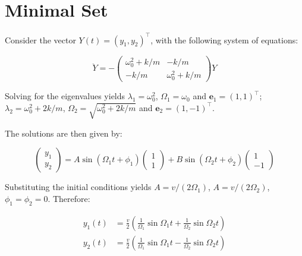 \documentclass[12pt]{article}
\begin{document}



\pagebreak
\section*{Minimal Set}



Consider the vector $Y(t) = (y_{1}, y_{2})^{\intercal}$, with the following system of equations:

\begin{equation}
    \ddot{Y} =
    -\begin{pmatrix}
        \omega_{0}^{2} + k/m & -k/m                 \\
        -k/m                 & \omega_{0}^{2} + k/m
    \end{pmatrix}
    Y
\end{equation}

Solving for the eigenvalues yields $\lambda_{1} = \omega_{0}^{2}$, $\Omega_{1} = \omega_{0}$ and $\mathbf{e}_{1} = (1, 1)^{\intercal}$; $\lambda_{2} = \omega_{0}^{2} + 2k/m$, $\Omega_{2} = \sqrt{\omega_{0}^{2} + 2k/m}$ and $\mathbf{e}_{2} = (1, -1)^{\intercal}$.

The solutions are then given by:

\begin{equation}
    \begin{pmatrix}
        y_{1} \\
        y_{2}
    \end{pmatrix} =
    A \sin{(\Omega_{1}t + \phi_{1})}
    \begin{pmatrix}
        1 \\
        1
    \end{pmatrix}
    +
    B \sin{(\Omega_{2}t + \phi_{2})}
    \begin{pmatrix}
        1 \\
        -1
    \end{pmatrix}
\end{equation}

Substituting the initial conditions yields $A = v/(2\Omega_{1})$, $A = v/(2\Omega_{2})$, $\phi_{1} = \phi_{2} = 0$. Therefore:

\begin{equation}
    \begin{split}
        y_{1}(t) &= \frac{v}{2} \left( \frac{1}{\Omega_{1}} \sin{\Omega_{1}t} + \frac{1}{\Omega_{2}} \sin{\Omega_{2}t} \right) \\
        y_{2}(t) &= \frac{v}{2} \left( \frac{1}{\Omega_{1}} \sin{\Omega_{1}t} - \frac{1}{\Omega_{2}} \sin{\Omega_{2}t} \right)
    \end{split}
\end{equation}
\end{document}
